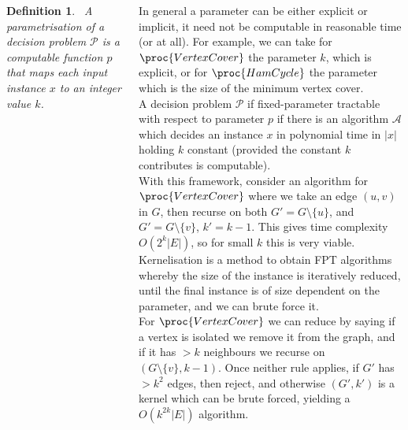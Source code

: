 \documentclass{tikzposter} %
\newtheorem{definition}{Definition}
\begin{document}
\begin{columns}
{    \begin{definition}
    \ A parametrisation of a decision problem $\mathcal{P}$ is a computable function $p$ that maps each input instance $x$ to an integer value $k$.
    \end{definition}

    In general a parameter can be either explicit or implicit, it need not be computable in reasonable time (or at all). For example, we can take for $\proc{VertexCover}$ the parameter $k$, which is explicit, or for $\proc{HamCycle}$ the parameter which is the size of the minimum vertex cover. \\

    A decision problem $\mathcal{P}$ if fixed-parameter tractable with respect to parameter $p$ if there is an algorithm $\mathcal{A}$ which decides an instance $x$ in polynomial time in $|x|$ holding $k$ constant (provided the constant $k$ contributes is computable). \\

    With this framework, consider an algorithm for $\proc{VertexCover}$ where we take an edge $(u,v)$ in $G$, then recurse on both $G' = G \setminus \{u\}$, and $G' = G \setminus \{v\}$, $k' = k-1$. This gives time complexity $O(2^{k}|E|)$, so for small $k$ this is very viable. \\

    Kernelisation is a method to obtain FPT algorithms whereby the size of the instance is iteratively reduced, until the final instance is of size dependent on the parameter, and we can brute force it. \\

    For $\proc{VertexCover}$ we can reduce by saying if a vertex is isolated we remove it from the graph, and if it has $> k$ neighbours we recurse on $(G \setminus \{v\}, k-1)$. Once neither rule applies, if $G'$ has $> k^{2}$ edges, then reject, and otherwise $(G', k')$ is a kernel which can be brute forced, yielding a $O(k^{2k}|E|)$ algorithm.
  }


\end{columns}
\end{document}
